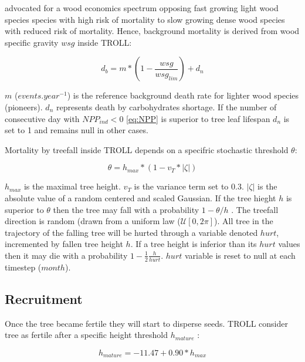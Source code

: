 \documentclass[12pt,]{article}
\theoremstyle{definition}
\theoremstyle{definition}
\theoremstyle{remark}
\begin{document}
\citet{chave_towards_2009} advocated for a wood economics spectrum
opposing fast growing light wood species species with high risk of
mortality to slow growing dense wood species with reduced risk of
mortality. Hence, background mortality is derived from wood specific
gravity \(wsg\) inside TROLL:

\begin{equation}
  d_b = m*(1-\frac{wsg}{wsg_{lim}})+d_n
  \label{eq:db}
\end{equation}

\(m\) (\(events.year^{-1}\)) is the reference background death rate for
lighter wood species (pioneers). \(d_n\) represents death by
carbohydrates shortage. If the number of consecutive day with
\(NPP_{ind} < 0\) \eqref{eq:NPP} is superior to tree leaf lifespan \(d_n\)
is set to 1 and remains null in other cases.

Mortality by treefall inside TROLL depends on a specifric stochastic
threshold \(\theta\):

\begin{equation}
  \theta = h_{max}*(1-v_T*|\zeta|)
  \label{eq:theta}
\end{equation}

\(h_{max}\) is the maximal tree height. \(v_T\) is the variance term set
to 0.3. \(|\zeta|\) is the absolute value of a random centered and
scaled Gaussian. If the tree hieght \(h\) is superior to \(\theta\) then
the tree may fall with a probability \(1-\theta/h\) \citep{Chave1999}.
The treefall direction is random (drawn from a uniform law
(\(\mathcal{U}[0,2\pi]\)). All tree in the trajectory of the falling
tree will be hurted through a variable denoted \(hurt\), incremented by
fallen tree height \(h\). If a tree height is inferior than its \(hurt\)
values then it may die with a probability
\(1-\frac{1}{2}\frac{h}{hurt}\). \(hurt\) variable is reset to null at
each timestep (\(month\)).

\subsection{Recruitment}\label{recruitment}

Once the tree became fertile they will start to disperse seeds. TROLL
consider tree as fertile after a specific height threshold
\(h_{mature}\) \citep{Wright2005}:

\begin{equation}
  h_{mature} = -11.47+0.90*h_{max}
  \label{eq:hmature}
\end{equation}
\end{document}
